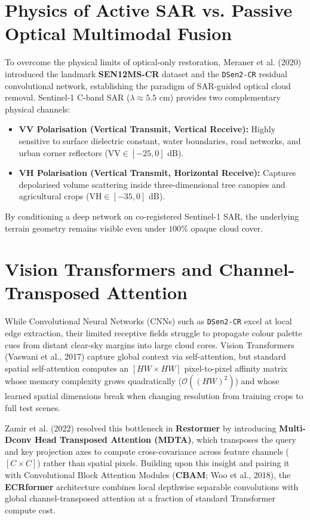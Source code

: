 \documentclass[12pt,a4paper]{report}
\begin{document}
\section{Physics of Active SAR vs. Passive Optical Multimodal Fusion}
To overcome the physical limits of optical-only restoration, Meraner et al. (2020) introduced the landmark \textbf{SEN12MS-CR} dataset and the \texttt{DSen2-CR} residual convolutional network, establishing the paradigm of SAR-guided optical cloud removal. Sentinel-1 C-band SAR ($\lambda \approx 5.5\text{ cm}$) provides two complementary physical channels:
\begin{itemize}
    \item \textbf{VV Polarisation (Vertical Transmit, Vertical Receive):} Highly sensitive to surface dielectric constant, water boundaries, road networks, and urban corner reflectors ($\text{VV} \in [-25, 0]\text{ dB}$).
    \item \textbf{VH Polarisation (Vertical Transmit, Horizontal Receive):} Captures depolarised volume scattering inside three-dimensional tree canopies and agricultural crops ($\text{VH} \in [-35, 0]\text{ dB}$).
\end{itemize}
By conditioning a deep network on co-registered Sentinel-1 SAR, the underlying terrain geometry remains visible even under $100\%$ opaque cloud cover.

\section{Vision Transformers and Channel-Transposed Attention}
While Convolutional Neural Networks (CNNs) such as \texttt{DSen2-CR} excel at local edge extraction, their limited receptive fields struggle to propagate colour palette cues from distant clear-sky margins into large cloud cores. Vision Transformers (Vaswani et al., 2017) capture global context via self-attention, but standard spatial self-attention computes an $[HW\times HW]$ pixel-to-pixel affinity matrix whose memory complexity grows quadratically ($\mathcal{O}((HW)^2)$) and whose learned spatial dimensions break when changing resolution from training crops to full test scenes.

Zamir et al. (2022) resolved this bottleneck in \textbf{Restormer} by introducing \textbf{Multi-Dconv Head Transposed Attention (MDTA)}, which transposes the query and key projection axes to compute cross-covariance across feature channels ($[C\times C]$) rather than spatial pixels. Building upon this insight and pairing it with Convolutional Block Attention Modules (\textbf{CBAM}; Woo et al., 2018), the \textbf{ECRformer} architecture combines local depthwise separable convolutions with global channel-transposed attention at a fraction of standard Transformer compute cost.
\end{document}
